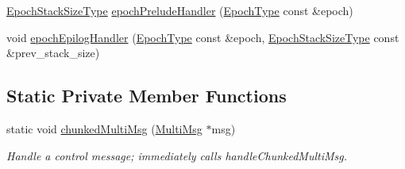 \begin{DoxyCompactItemize}
\hyperlink{structvt_1_1messaging_1_1_active_messenger_a447c6c0b3387142fd14b26c12e3ed877}{Epoch\+Stack\+Size\+Type} \hyperlink{structvt_1_1messaging_1_1_active_messenger_a8209c23bddf111089f4fd64d7cd2f67e}{epoch\+Prelude\+Handler} (\hyperlink{namespacevt_a985a5adf291c34a3ca263b3378388236}{Epoch\+Type} const \&epoch)
\item 
void \hyperlink{structvt_1_1messaging_1_1_active_messenger_a6418078d6eba01bfd36e46d54c076713}{epoch\+Epilog\+Handler} (\hyperlink{namespacevt_a985a5adf291c34a3ca263b3378388236}{Epoch\+Type} const \&epoch, \hyperlink{structvt_1_1messaging_1_1_active_messenger_a447c6c0b3387142fd14b26c12e3ed877}{Epoch\+Stack\+Size\+Type} const \&prev\+\_\+stack\+\_\+size)
\end{DoxyCompactItemize}
\subsection*{Static Private Member Functions}
\begin{DoxyCompactItemize}
\item 
static void \hyperlink{structvt_1_1messaging_1_1_active_messenger_ae8f6417a532c73601f9c26190a29a21e}{chunked\+Multi\+Msg} (\hyperlink{structvt_1_1messaging_1_1_multi_msg}{Multi\+Msg} $\ast$msg)
\begin{DoxyCompactList}\small\item\em Handle a control message; immediately calls {\ttfamily handle\+Chunked\+Multi\+Msg}. \end{DoxyCompactList}\end{DoxyCompactItemize}
